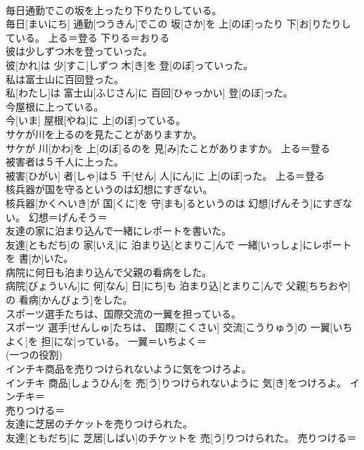 \documentclass[8pt]{extreport}
\begin{document}
\begin{CJK}{UTF8}{min}
{\\	毎日通勤でこの坂を上ったり下りたりしている。	
\\	毎日[まいにち] 通勤[つうきん]でこの 坂[さか]を 上[のぼ]ったり 下[お]りたりしている。	上る＝登る 下りる＝おりる
\\	彼は少しずつ木を登っていった。	
\\	彼[かれ]は 少[すこ]しずつ 木[き]を 登[のぼ]っていった。	
\\	私は富士山に百回登った。	
\\	私[わたし]は 富士山[ふじさん]に 百回[ひゃっかい] 登[のぼ]った。	
\\	今屋根に上っている。	
\\	今[いま] 屋根[やね]に 上[のぼ]っている。	
\\	サケが川を上るのを見たことがありますか。	
\\	サケが 川[かわ]を 上[のぼ]るのを 見[み]たことがありますか。	上る＝登る
\\	被害者は５千人に上った。	
\\	被害[ひがい] 者[しゃ]は５ 千[せん] 人[にん]に 上[のぼ]った。	上る＝登る
\\	核兵器が国を守るというのは幻想にすぎない。	
\\	核兵器[かくへいき]が 国[くに]を 守[まも]るというのは 幻想[げんそう]にすぎない。	幻想＝げんそう＝ 
\\	友達の家に泊まり込んで一緒にレポートを書いた。	
\\	友達[ともだち]の 家[いえ]に 泊まり込[とまりこ]んで 一緒[いっしょ]にレポートを 書[か]いた。	
\\	病院に何日も泊まり込んで父親の看病をした。	
\\	病院[びょういん]に 何[なん] 日[にち]も 泊まり込[とまりこ]んで 父親[ちちおや]の 看病[かんびょう]をした。	
\\	スポーツ選手たちは、国際交流の一翼を担っている。	
\\	スポーツ 選手[せんしゅ]たちは、 国際[こくさい] 交流[こうりゅう]の 一翼[いちよく]を 担[にな]っている。	一翼＝いちよく＝ 
\\	(一つの役割) 
\\	インチキ商品を売りつけられないように気をつけろよ。	
\\	インチキ 商品[しょうひん]を 売[う]りつけられないように 気[き]をつけろよ。	インチキ＝ 
\\	売りつける＝ 
\\	友達に芝居のチケットを売りつけられた。	
\\	友達[ともだち]に 芝居[しばい]のチケットを 売[う]りつけられた。	売りつける＝ 
}
\end{CJK}
\end{document}

